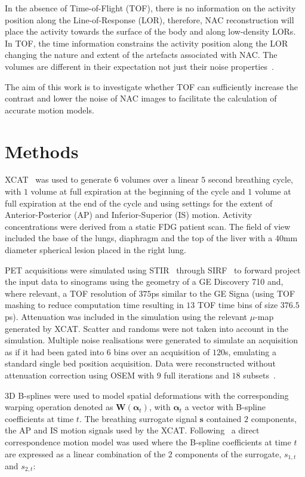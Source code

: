 \documentclass[portrait,color=UCLburgundy,margin=3cm]{uclposter}
\begin{document}
\begin{multicols}{4}
In the absence of Time-of-Flight (TOF), there is no information on the activity position along the Line-of-Response (LOR), therefore, NAC reconstruction will place the activity towards the surface of the body and along low-density LORs. In TOF, the time information constrains the activity position along the LOR changing the nature and extent of the artefacts associated with NAC. The volumes are different in their expectation not just their noise properties~\cite{Ter-Pogossian1981}.

The aim of this work is to investigate whether TOF can sufficiently increase the contrast and lower the noise of NAC images to facilitate the calculation of accurate motion models.

\section*{Methods}
XCAT~\cite{Segars2010} was used to generate $6$ volumes over a linear $5$ second breathing cycle, with $1$ volume at full expiration at the beginning of the cycle and $1$ volume at full expiration at the end of the cycle and using settings for the extent of Anterior-Posterior (AP) and Inferior-Superior (IS) motion. Activity concentrations were derived from a static FDG patient scan. The field of view included the base of the lungs, diaphragm and the top of the liver with a $40$mm diameter spherical lesion placed in the right lung.

PET acquisitions were simulated using STIR~\cite{Thielemans2012,Efthimiou2018} through SIRF~\cite{Ovtchinnikov2017} to forward project the input data to sinograms using the geometry of a GE Discovery 710 and, where relevant, a TOF resolution of $375$ps similar to the GE Signa (using TOF mashing to reduce computation time resulting in $13$ TOF time bins of size $376.5$ps). Attenuation was included in the simulation using the relevant $\mu$-map generated by XCAT. Scatter and randoms were not taken into account in the simulation. Multiple noise realisations were generated to simulate an acquisition as if it had been gated into $6$ bins over an acquisition of $120$s, emulating a standard single bed position acquisition. Data were reconstructed without attenuation correction using OSEM with $9$ full iterations and $18$ subsets~\cite{Hudson1994}. 

3D B-splines were used to model spatial deformations with the corresponding warping operation denoted as $\mathbf{W}(\mathbf{\alpha}_t)$, with $\mathbf{\alpha}_t$ a vector with B-spline coefficients at time $t$. The breathing surrogate signal $\mathbf{s}$ contained $2$ components, the AP and IS motion signals used by the XCAT.  Following~\cite{McClelland2013} a direct correspondence motion model was used where the B-spline coefficients at time $t$ are expressed as a linear combination of the $2$ components of the surrogate, $s_{1,t}$ and $s_{2,t}$:


\end{multicols}
\end{document}
